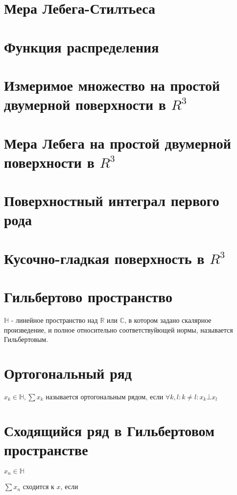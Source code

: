 \documentclass[paper=a4, fontsize=17pt]{article}
\begin{document}
\section{Мера Лебега-Стилтьеса}

\section{Функция распределения}

\section{Измеримое множество на простой двумерной поверхности в $R^3$}

\section{Мера Лебега на простой двумерной поверхности в $R^3$}

\section{Поверхностный интеграл первого рода}

\section{Кусочно-гладкая поверхность в $R^3$}

\section{Гильбертово пространство}
$\mathds{H}$ - линейное пространство над $\mathds{R}$ или $\mathds{C}$, в котором задано скалярное произведение, и полное относительно соответствуйющей нормы, называется Гильбертовым.

\section{Ортогональный ряд}
$x_k \in \mathds{H}, \sum x_k$ называется ортогональным рядом, если $\forall k, l: k \neq l: x_k \bot x_l$

\section{Сходящийся ряд в Гильбертовом пространстве}
$x_n \in \mathds{H}$

$\sum x_n$ сходится к $x$, если
\end{document}
